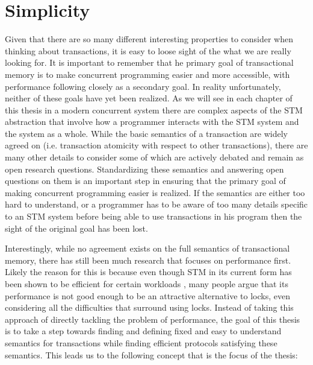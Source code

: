 \section{Simplicity}
Given that there are so many different interesting properties to consider
when thinking about transactions, it is easy to loose sight of the what
we are really looking for.
It is important to remember that he primary goal of transactional memory is to make concurrent programming
easier and more accessible, with performance following closely as a secondary goal.
In reality unfortunately, neither of these goals have yet been realized.
As we will see in each chapter of this thesis  in a modern concurrent system
there are complex aspects
of the STM abstraction that involve how a programmer interacts with the
STM system and the system as a whole.
While the basic semantics of a transaction are widely agreed on
(i.e. transaction atomicity with respect to other transactions),
there are many other details to consider
some of which are actively debated and remain as open research questions.
Standardizing these semantics and answering open questions on them is an important
step in ensuring that the primary goal of making concurrent programming easier
is realized.
If the semantics are either too hard to understand, or a programmer has to be aware of
too many details specific to an STM system before being able to use transactions in
his program then the sight of the original goal has been lost.

Interestingly, while no agreement exists on the full semantics of transactional memory,
there has still been much research that focuses on performance first.
Likely the reason for this is because even though STM in its current form has been shown
to be efficient for certain workloads \cite{DFGG11}, many people argue that
its performance is not good enough to be an attractive alternative to locks, even considering all the
difficulties that surround using locks.
Instead of taking this approach of directly tackling the problem of performance,
the goal of this thesis is to take a step towards finding and defining fixed and easy to understand semantics
for transactions while finding efficient protocols satisfying these semantics.
This leads us to the following concept that is the focus of the thesis:

